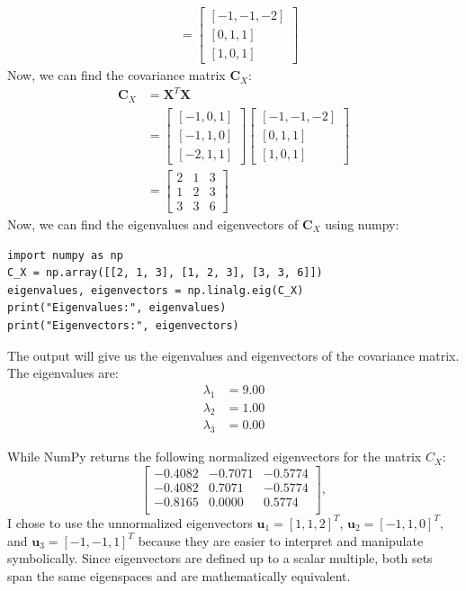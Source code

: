 \documentclass[a3paper,12pt]{extarticle} %
\begin{document}
\begin{enumerate}
\begin{align}
&= \begin{bmatrix} [-1, -1, -2] \\ [0, 1, 1] \\ [1, 0, 1] \end{bmatrix}
\end{align}
Now, we can find the covariance matrix $\mathbf{C}_X$:
\begin{align}
\mathbf{C}_X &=  \mathbf{X}^T \mathbf{X}\\
&=  \begin{bmatrix} [-1, 0, 1] \\ [-1, 1, 0] \\ [-2, 1, 1] \end{bmatrix} \begin{bmatrix} [-1, -1, -2] \\ [0, 1, 1] \\ [1, 0, 1] \end{bmatrix}\\
&= \begin{bmatrix} 2 & 1 & 3 \\ 1 & 2 & 3 \\ 3 & 3 & 6 \end{bmatrix}
\end{align}
Now, we can find the eigenvalues and eigenvectors of $\mathbf{C}_X$ using numpy:
\begin{verbatim}
import numpy as np
C_X = np.array([[2, 1, 3], [1, 2, 3], [3, 3, 6]])
eigenvalues, eigenvectors = np.linalg.eig(C_X)
print("Eigenvalues:", eigenvalues)
print("Eigenvectors:", eigenvectors)
\end{verbatim}
The output will give us the eigenvalues and eigenvectors of the covariance matrix. The eigenvalues are:
\begin{align}
\lambda_1 &= 9.00\\
\lambda_2 &= 1.00\\
\lambda_3 &= 0.00
\end{align}

While NumPy returns the following normalized eigenvectors for the matrix $C_X$: 
\[
\begin{bmatrix}
-0.4082 & -0.7071 & -0.5774 \\
-0.4082 & 0.7071 & -0.5774 \\
-0.8165 & 0.0000 & 0.5774 \\
\end{bmatrix},
\]
I chose to use the unnormalized eigenvectors 
$\mathbf{u}_1 = [1, 1, 2]^T$, 
$\mathbf{u}_2 = [-1, 1, 0]^T$, and 
$\mathbf{u}_3 = [-1, -1, 1]^T$ 
because they are easier to interpret and manipulate symbolically. Since eigenvectors are defined up to a scalar multiple, both sets span the same eigenspaces and are mathematically equivalent.


\end{enumerate}
\end{document}
